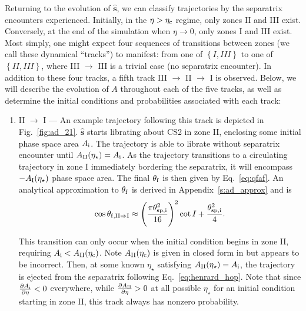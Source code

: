 \documentclass[
        fleqn,
        usenatbib,
        referee,
    ]{mnras}
\newcommand*{\pd}[2]{\frac{\partial#1}{\partial#2}}
\newcommand*{\bm}[1]{\boldsymbol{\mathbf{#1}}}
\newcommand*{\uv}[1]{\hat{\bm{#1}}}
\newcommand*{\p}[1]{\left(#1\right)}
\newcommand*{\z}[1]{\left\{#1\right\}}
\begin{document}
Returning to the evolution of $\uv{s}$, we can classify trajectories by the
separatrix encounters experienced. Initially, in the $\eta > \eta_{\rm c}$ regime,
only zones II and III exist. Conversely, at the end of the simulation when $\eta
\to 0$, only zones I and III exist. Most simply, one might expect four sequences
of transitions between zones (we call these dynamical ``tracks'') to manifest:
from one of $\z{I, III}$ to one of $\z{II, III}$, where III $\to$ III is a
trivial case (no separatrix encounter). In addition to these four tracks, a
fifth track III $\to$ II $\to$ I is observed. Below, we will describe the
evolution of $A$ throughout each of the five tracks, as well as determine the
initial conditions and probabilities associated with each track:
\begin{enumerate}
    \item II $\to$ I --- An example trajectory following this track is depicted
        in Fig.~\ref{fig:ad_21}. $\uv{s}$ starts librating about CS2 in zone II,
        enclosing some initial phase space area $A_{\rm i}$. The trajectory is
        able to librate without separatrix encounter until $A_{\rm
        II}(\eta_\star) = A_{\rm i}$. As the trajectory transitions to a
        circulating trajectory in zone I immediately bordering the separatrix,
        it will encompass $-A_{\rm I}(\eta_\star)$ phase space area. The final
        $\theta_{\rm f}$ is then given by Eq.~\eqref{eq:qfaf}. An analytical
        approximation to $\theta_{\rm f}$ is derived in
        Appendix~\ref{s:ad_approx} and is
        \begin{equation}
            \cos \theta_{\rm f, II \Rightarrow I} \approx
                \p{\frac{\pi \theta_{\rm sp, i}^2}{16}}^2 \cot I
                    + \frac{\theta_{\rm sp, i}^2}{4}.\label{eq:qf_21_approx}
        \end{equation}

        This transition can only occur when the initial condition begins in zone
        II, requiring $A_{\rm i} < A_{\rm II}(\eta_{\rm c})$. Note $A_{\rm II}(\eta_{\rm c})$ is
        given in closed form in \citet{ward2004I} but appears to be incorrect.
        Then, at some known $\eta_\star$ satisfying $A_{\rm II}(\eta_\star) =
        A_{\rm i}$, the trajectory is ejected from the separatrix following
        Eq.~\eqref{eq:henrard_hop}. Note that since $\pd{A_{\rm i}}{\eta} < 0$
        everywhere, while $\pd{A_{\rm II}}{\eta} > 0$ at all possible
        $\eta_\star$ for an initial condition starting in zone II, this track
        always has nonzero probability.


\end{enumerate}
\end{document}
